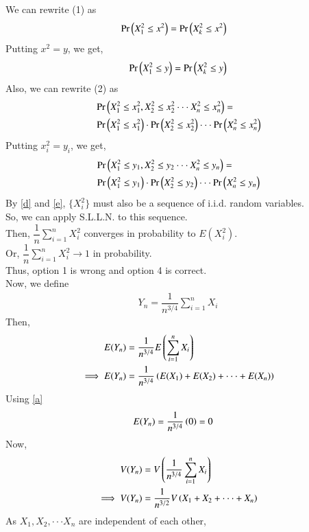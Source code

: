 \documentclass[journal,12pt,twocolumn]{IEEEtran}
\begin{document}
We can rewrite (1) as
\begin{align}
    &\Pr\left(X_1^2 \leq x^2\right)=\Pr\left(X_k^2 \leq x^2\right)
\end{align}
Putting $x^2=y$, we get,
\begin{align} \label{d}
    \Pr\left(X_1^2 \leq y\right)=\Pr\left(X_k^2 \leq y\right)
\end{align}
Also, we can rewrite (2) as
\begin{align}
    &\Pr\left(X_1^2 \leq x_1^2, X_2^2 \leq x_2^2 \cdot \cdot \cdot X_n^2 \leq x_n^2 \right) = \nonumber \\
    &\Pr\left(X_1^2 \leq x_1^2\right) \cdot \Pr\left(X_2^2 \leq x_2^2\right) \cdot \cdot \cdot \Pr\left(X_n^2 \leq x_n^2\right)
\end{align}
Putting $x_i^2=y_i$, we get,
\begin{align} \label{e}
    &\Pr\left(X_1^2 \leq y_1, X_2^2 \leq y_2 \cdot \cdot \cdot X_n^2 \leq y_n \right) = \nonumber \\
    &\Pr\left(X_1^2 \leq y_1\right) \cdot \Pr\left(X_2^2 \leq y_2\right) \cdot \cdot \cdot \Pr\left(X_n^2 \leq y_n\right)
\end{align}
By \eqref{d} and \eqref{e}, $\{X_i^2\}$ must also be a sequence of i.i.d. random variables.\\
So, we can apply S.L.L.N. to this sequence.\\
Then, $\dfrac{1}{n}\sum_{i=1}^nX_i^2$ converges in probability to $E(X_i^2)$.\\
Or, $\dfrac{1}{n}\sum_{i=1}^nX_i^2 \to 1$ in probability.\\
Thus, option 1 is wrong and option 4 is correct.
\vspace{0.3cm}\\
Now, we define
\begin{align}
    Y_n=\dfrac{1}{n^{3/4}}\sum_{i=1}^nX_i
\end{align}
Then,
\begin{align}
    E(Y_n) &= \dfrac{1}{n^{3/4}}E\left(\sum_{i=1}^nX_i\right) \\
    \implies E(Y_n) &= \dfrac{1}{n^{3/4}}\left(E(X_1)+E(X_2)+ \cdot \cdot \cdot +E(X_n)\right)
\end{align}
Using \eqref{a}
\begin{align}
    E(Y_n) &= \dfrac{1}{n^{3/4}}\left(0\right) =0
\end{align}
Now,
\begin{align}
    V(Y_n) &= V\left(\dfrac{1}{n^{3/4}}\sum_{i=1}^nX_i\right) \\
    \implies V(Y_n) &= \dfrac{1}{n^{3/2}}V\left(X_1+X_2+ \cdot \cdot \cdot +X_n\right)
\end{align}
As $X_1, X_2, \cdot \cdot \cdot X_n$ are independent of each other,
\end{document}

